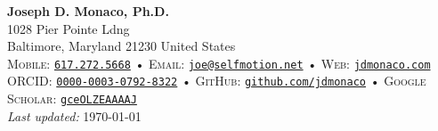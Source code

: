 \begin{center}
  \textbf{\LARGE\color{hopkinsblue} Joseph D. Monaco, Ph.D.} \\[0.1in]
  1028 Pier Pointe Ldng \\
  Baltimore, Maryland 21230 United States \\[2mm]
  \small
  \textsc{Mobile:} \href{tel:16172725668}{\color{hopkinsblue}\texttt{617.272.5668}} •
  \textsc{Email:} \href{mailto:joe@selfmotion.net}{\color{hopkinsblue}\texttt{joe@selfmotion.net}} • 
  \textsc{Web:} \href{https://jdmonaco.com/}{\color{hopkinsblue}\texttt{jdmonaco.com}} \\  
  \textsc{ORCID:} \href{https://jdmonaco.com/orcid}{\color{hopkinsblue}\texttt{0000-0003-0792-8322}} • 
  \textsc{GitHub:} \href{https://jdmonaco.com/github}{\color{hopkinsblue}\texttt{github.com/jdmonaco}} • 
  \textsc{Google Scholar:} \href{https://jdmonaco.com/google-scholar}{\color{hopkinsblue}\texttt{gceOLZEAAAAJ}} \\
  {\tiny \emph{Last updated:} \today}
\end{center}



